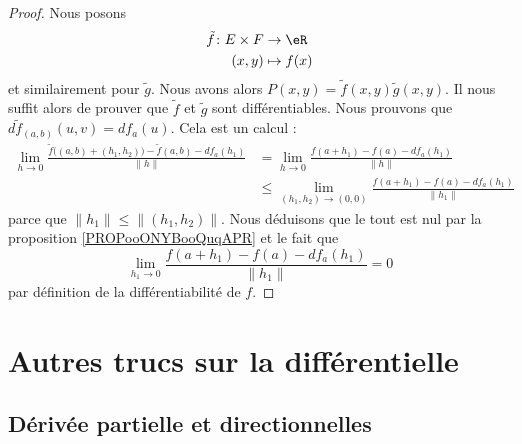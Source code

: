 \begin{proof}
	Nous posons
	\begin{equation}
		\begin{aligned}
			\tilde f\colon E\times F & \to \eR      \\
			(x,y)                    & \mapsto f(x)
		\end{aligned}
	\end{equation}
	et similairement pour \( \tilde g\). Nous avons alors \( P(x,y)=\tilde f(x,y)\tilde g(x,y)\). Il nous suffit alors de prouver que \( \tilde f\) et \( \tilde g\) sont différentiables. Nous prouvons que \( d\tilde f_{(a,b)}(u,v)=df_a(u)\). Cela est un calcul :
	\begin{subequations}
		\begin{align}
			\lim_{h\to 0}\frac{ \tilde f\big( (a,b)+(h_1,h_2) \big) -\tilde f(a,b)-df_a(h_1) }{ \| h \| } & =\lim_{h\to 0}\frac{ f(a+h_1)-f(a)-df_a(h_1) }{ \| h \| }                   \\
			                                                                                              & \leq \lim_{(h_1,h_2)\to (0,0)}\frac{ f(a+h_1)-f(a)-df_a(h_1) }{ \| h_1 \| }
		\end{align}
	\end{subequations}
	parce que \( \| h_1 \|\leq \| (h_1,h_2) \|\). Nous déduisons que le tout est nul par la proposition \ref{PROPooONYBooQuqAPR} et le fait que
	\begin{equation}
		\lim_{h_1\to 0} \frac{ f(a+h_1)-f(a)-df_a(h_1) }{ \| h_1 \| }=0
	\end{equation}
	par définition de la différentiabilité de \( f\).
\end{proof}


\section{Autres trucs sur la différentielle}



\subsection{Dérivée partielle et directionnelles}

